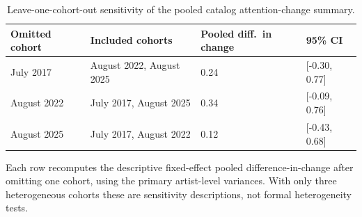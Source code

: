 \begin{table}[!htbp]
\centering
\footnotesize
\caption{Leave-one-cohort-out sensitivity of the pooled catalog attention-change summary.}
\label{tab:si-catalog-retention-loco}
\renewcommand{\arraystretch}{1.05}
\begin{tabular}{llll}
\toprule
Omitted cohort & Included cohorts & Pooled diff.\ in change & 95\% CI \\
\midrule
July 2017 & August 2022, August 2025 & 0.24 & [-0.30, 0.77] \\
August 2022 & July 2017, August 2025 & 0.34 & [-0.09, 0.76] \\
August 2025 & July 2017, August 2022 & 0.12 & [-0.43, 0.68] \\
\bottomrule
\end{tabular}
\begin{flushleft}\footnotesize
Each row recomputes the descriptive fixed-effect pooled difference-in-change after omitting one cohort, using the primary artist-level variances. With only three heterogeneous cohorts these are sensitivity descriptions, not formal heterogeneity tests.
\end{flushleft}
\end{table}
